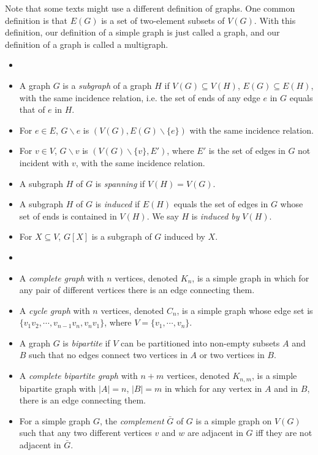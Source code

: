         Note that some texts might use a different definition of graphs. One common definition is that $E(G)$ is a set of two-element subsets of $V(G)$. With this definition, our definition of a simple graph is just called a graph, and our definition of a graph is called a multigraph.
        
        \begin{defn}[Subgraph] \label{def_subgraph} \begin{itemize}
            \item[]
            \item A graph $G$ is a \emph{subgraph} of a graph $H$ if $V(G) \subseteq V(H)$, $E(G) \subseteq E(H)$, with the same incidence relation, i.e. the set of ends of any edge $e$ in $G$ equals that of $e$ in $H$.
            \item For $e \in E$, $G \backslash e$ is $(V(G), E(G) \backslash \{e\})$ with the same incidence relation.
            \item For $v \in V$, $G \backslash v$ is $(V(G) \backslash \{v\}, E')$, where $E'$ is the set of edges in $G$ not incident with $v$, with the same incidence relation.
            \item A subgraph $H$ of $G$ is \emph{spanning} if $V(H) = V(G)$.
            \item A subgraph $H$ of $G$ is \emph{induced} if $E(H)$ equals the set of edges in $G$ whose set of ends is contained in $V(H)$. We say $H$ is \emph{induced by} $V(H)$.
            \item For $X \subseteq V$, $G[X]$ is a subgraph of $G$ induced by $X$.
        \end{itemize} \end{defn}
        
        \begin{defn} \label{def_graph_example} \begin{itemize}
            \item[]
            \item A \emph{complete graph} with $n$ vertices, denoted $K_n$, is a simple graph in which for any pair of different vertices there is an edge connecting them.
            \item A \emph{cycle graph} with $n$ vertices, denoted $C_n$, is a simple graph whose edge set is $\{v_1v_2, \cdots, v_{n-1}v_n, v_nv_1\}$, where $V = \{v_1, \cdots, v_n\}$.
            \item A graph $G$ is \emph{bipartite} if $V$ can be partitioned into non-empty subsets $A$ and $B$ such that no edges connect two vertices in $A$ or two vertices in $B$.
            \item A \emph{complete bipartite graph} with $n+m$ vertices, denoted $K_{n,m}$, is a simple bipartite graph with $|A|=n$, $|B|=m$ in which for any vertex in $A$ and in $B$, there is an edge connecting them.
            \item For a simple graph $G$, the \emph{complement} $\bar{G}$ of $G$ is a simple graph on $V(G)$ such that any two different vertices $v$ and $w$ are adjacent in $G$ iff they are not adjacent in $\bar{G}$.
        \end{itemize} \end{defn}
        
